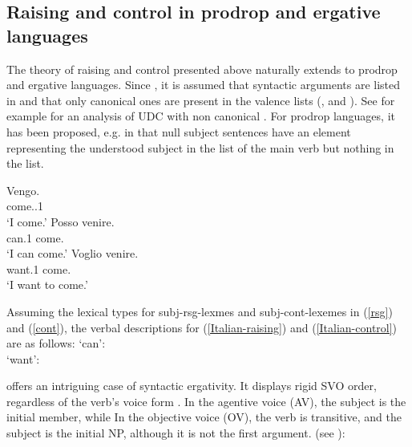 \documentclass[output=paper
	        ,collection
	        ,collectionchapter
 	        ,biblatex
                ,babelshorthands
                ,newtxmath
                ,draftmode
                ,colorlinks, citecolor=brown
]{langscibook}
\begin{document}
\subsection{Raising and control in prodrop and ergative languages}
The theory of raising and control presented above naturally extends to prodrop and ergative languages. 
Since \citet{BMS2001a}, it is assumed that syntactic arguments are listed in \argst and that only
canonical ones are present in the valence lists (\subj, \spr and \comps). See for example  for an analysis of UDC with non canonical \synsem . For prodrop languages, it
has been proposed, e.g. in \citep[]{ManningandSag1998} that null subject sentences have an element representing the understood subject in the \argst list of the main verb but nothing in the \subj list. 

\eal
\ex 
\label{Italian}
\gll Vengo.\\
     come.\PRS.1\SG\\
\glt `I come.'
\ex 
\label{Italian-raising}
\gll Posso venire.\\
     can.1\SG{} come.\INF\\
\glt `I can come.'
\ex 
\label{Italian-control}
\gll Voglio venire.\\ 
     want.1\SG{} come.\INF\\
\glt `I want to come.'
\zl

Assuming the lexical types for subj-rsg-lexmes and subj-cont-lexemes in (\ref{rsg}) and (\ref{cont}), the verbal descriptions for (\ref{Italian-raising}) and (\ref{Italian-control})  are as follows:
\eal
\ex	
{} `can':\\
\label{rais1}
\ex 
{} `want':\\
\zl


 offers an intriguing case of syntactic ergativity. It displays rigid SVO order, regardless of the verb's voice form \citep{WechslerandArka1998}. In the agentive voice (AV), the subject is the \argst initial member, while In the objective voice (OV), the verb is transitive, and the subject is the initial NP, although it is not the first argument.  (see ):
\end{document}
